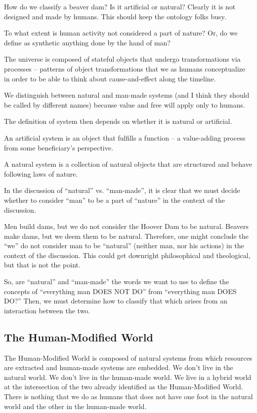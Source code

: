 How do we classify a beaver dam?  Is it artificial or natural?  Clearly it is not designed and made by humans. This should keep the ontology folks busy.
	
To what extent is human activity not considered a part of nature? Or, do we define as synthetic anything done by the hand of man?

The universe is composed of stateful objects that undergo transformations via processes – patterns of object transformations that we as humans conceptualize in order to be able to think about cause-and-effect along the timeline.

We distinguish between natural and man-made systems (and I think they should be called by different names) because value and free will apply only to humans.

The definition of system then depends on whether it is natural or artificial.

An artificial system is an object that fulfills a function – a value-adding process from some beneficiary’s perspective.

A natural system is a collection of natural objects that are structured and behave following laws of nature.

In the discussion of “natural” vs. “man-made”, it is clear that we must decide whether to consider “man” to be a part of “nature” in the context of the discussion.

Men build dams, but we do not consider the Hoover Dam to be natural. Beavers make dams, but we deem them to be natural. Therefore, one might conclude the “we” do not consider man to be “natural” (neither man, nor his actions) in the context of the discussion. This could get downright philosophical and theological, but that is not the point.

So, are “natural” and “man-made” the words we want to use to define the concepts of “everything man DOES NOT DO” from “everything man DOES DO?”  Then, we must determine how to classify that which arises from an interaction between the two.
    
\subsection{The Human-Modified World}\label{subsec:humanModifiedWorld}

The Human-Modified World is composed of natural systems from which resources are extracted and human-made systems are embedded. We don’t live in the natural world. We don’t live in the human-made world. We live in a hybrid world at the intersection of the two already identified as the Human-Modified World. There is nothing that we do as humans that does not have one foot in the natural world and the other in the human-made world.

